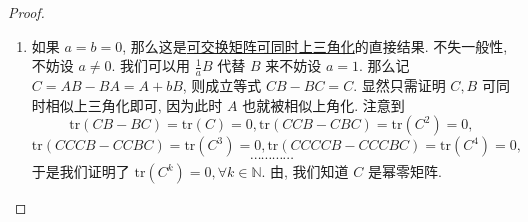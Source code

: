 \documentclass[../../main.tex]{subfiles}%
\begin{document}
\begin{proof}
\begin{enumerate}[(1)]
$\mathbf{Step}\,\,\mathbf{1}$ 若 \( \mathrm{Ker} A \subset \mathrm{Ker}(AB - BA) \), 则设 \( x \in \mathrm{Ker} A \), 我们有 \( ABx = BAx = 0 \), 这就证明了 \( \mathrm{Ker} A \) 是 \( B \) 不变子空间.

$\mathbf{Step}\,\,\mathbf{2}$ 若 \( \mathrm{Ker} A \not\subset \mathrm{Ker}(AB - BA) \) 成立, 取 \( x \in \mathrm{Ker} A \) 使得 \( y = (AB - BA)x \neq 0 \). 注意到 \( \mathrm{rank}(AB - BA) = 1 \), 故 \( \mathrm{Im}(AB - BA) = \mathrm{span}\{y\} \). 但是
\[
y = (AB - BA)x = ABx - BAx = ABx \in \mathrm{Im} A,
\]
这就说明 \( \mathrm{Im}(AB - BA) \subset \mathrm{Im} A \). 于是对 \( u = Av \in \mathrm{Im} A \), 我们有
\[
Bu = BAv = ABv - (AB - BA)v \in \mathrm{Im} A,
\]
从而确实了 \( \mathrm{Im} A \) 是 \( B \) 不变子空间.

注意到 \( A, B \) 有一个公共非平凡不变子空间. 所以取这个不变子空间一组基扩充为全空间的基, 则 \( A, B \) 有表示矩阵
\[
\widetilde{A} = \begin{pmatrix} A_1 & A_3 \\ 0 & A_2 \end{pmatrix}, \widetilde{B} = \begin{pmatrix} B_1 & B_3 \\ 0 & B_2 \end{pmatrix}.
\]
注意到
\begin{align*}
r(AB - BA) &= r\begin{pmatrix} A_1B_1 - B_1A_1 & * \\ 0 & A_2B_2 - B_2A_2 \end{pmatrix}
\\
&\stackrel{\text{\hyperref[proposition:矩阵秩的基本公式-3]{proposition:矩阵秩的基本公式-(3)}}}{\geqslant} r\begin{pmatrix} A_1B_1 - B_1A_1 & 0 \\ 0 & A_2B_2 - B_2A_2 \end{pmatrix} 
\\
&= r(A_1B_1 - B_1A_1) + r(A_2B_2 - B_2A_2),
\end{align*}
我们有
\[
r(A_1B_1 - B_1A_1) \leqslant 1, r(A_2B_2 - B_2A_2) \leqslant 1,
\]
现在阶降下去了, 类似我们前面的归纳证明我们知道 \( A, B \) 可同时相似上三角化.

\item 如果 \( a = b = 0 \), 那么这是\hyperref[proposition:一族两两可交换的一般域上的矩阵可同时上三角化]{可交换矩阵可同时上三角化}的直接结果. 不失一般性, 不妨设 \( a \neq 0 \). 我们可以用 \( \frac{1}{a}B \) 代替 \( B \) 来不妨设 \( a = 1 \). 那么记 \( C = AB - BA = A + bB \), 则成立等式 \( CB - BC = C \). 显然只需证明 \( C, B \) 可同时相似上三角化即可, 因为此时 \( A \) 也就被相似上角化. 注意到
\[
\mathrm{tr}(CB - BC) = \mathrm{tr}(C) = 0, \mathrm{tr}(CCB - CBC) = \mathrm{tr}(C^2) = 0,
\]
\[
\mathrm{tr}(CCCB - CCBC) = \mathrm{tr}(C^3) = 0, \mathrm{tr}(CCCCB - CCCBC) = \mathrm{tr}(C^4) = 0,
\]
\[
\cdots\cdots\cdots\cdots
\]
于是我们证明了 \( \mathrm{tr}(C^k) = 0, \forall k \in \mathbb{N} \). 由, 我们知道 \( C \) 是幂零矩阵.


\end{enumerate}
\end{proof}
\end{document}
